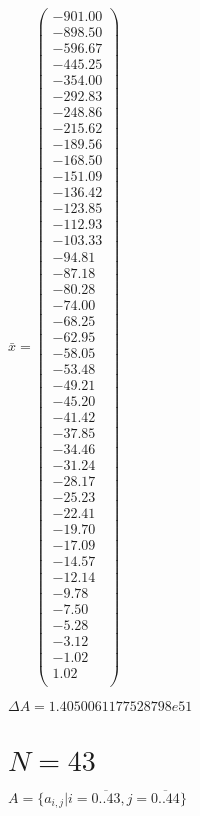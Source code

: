 \documentclass[a4paper,12pt]{article}
\begin{document}
$\bar { x } = \begin{pmatrix}
-901.00 \\
-898.50 \\
-596.67 \\
-445.25 \\
-354.00 \\
-292.83 \\
-248.86 \\
-215.62 \\
-189.56 \\
-168.50 \\
-151.09 \\
-136.42 \\
-123.85 \\
-112.93 \\
-103.33 \\
-94.81 \\
-87.18 \\
-80.28 \\
-74.00 \\
-68.25 \\
-62.95 \\
-58.05 \\
-53.48 \\
-49.21 \\
-45.20 \\
-41.42 \\
-37.85 \\
-34.46 \\
-31.24 \\
-28.17 \\
-25.23 \\
-22.41 \\
-19.70 \\
-17.09 \\
-14.57 \\
-12.14 \\
-9.78 \\
-7.50 \\
-5.28 \\
-3.12 \\
-1.02 \\
1.02 \\
\end{pmatrix}
$

$\Delta A = 1.4050061177528798e51$



\section{ $N = 43$ }
$A = \{ a _{ i, j } | i = \overline { 0..43 }, j = \overline { 0..44 } \}$
\end{document}
